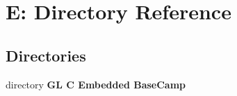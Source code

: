 \section{E\+: Directory Reference}
\label{dir_885cc87fac2d91e269af0a5a959fa5f6}
\subsection*{Directories}
\begin{DoxyCompactItemize}
\item 
directory \textbf{ G\+L C Embedded Base\+Camp}
\end{DoxyCompactItemize}
